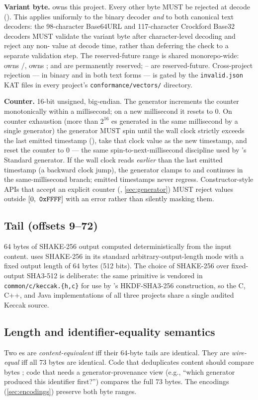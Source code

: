 \textbf{Variant byte.}  owns this project. Every other byte MUST be rejected at decode (). This applies uniformly to the binary decoder \emph{and} to both canonical text decoders: the 98-character Base64URL and 117-character Crockford Base32 decoders MUST validate the variant byte after character-level decoding and reject any non- value at decode time, rather than deferring the check to a separate validation step. The reserved-future range is shared monorepo-wide: \tesseraid{} owns /, \tesseraseal{} owns ;  and  are permanently reserved; -- are reserved-future. Cross-project rejection --- in binary and in both text forms --- is gated by the \texttt{invalid.json} KAT files in every project's \texttt{conformance/vectors/} directory.

\textbf{Counter.} 16-bit unsigned, big-endian. The generator increments the counter monotonically within a millisecond; on a new millisecond it resets to 0. On counter exhaustion (more than $2^{16}$ \tesserahash{}es generated in the same millisecond by a single generator) the generator MUST spin until the wall clock strictly exceeds the last emitted timestamp (), take that clock value as the new timestamp, and reset the counter to 0 --- the same spin-to-next-millisecond discipline used by \tesseraid{}'s Standard generator. If the wall clock reads \emph{earlier} than the last emitted timestamp (a backward clock jump), the generator clamps to  and continues in the same-millisecond branch; emitted timestamps never regress. Constructor-style APIs that accept an explicit counter (, \cref{sec:generator}) MUST reject values outside $[0,\ \texttt{0xFFFF}]$ with an error rather than silently masking them.

\subsection{Tail (offsets 9--72)}

64 bytes of SHAKE-256 \citep{fips202} output computed deterministically from the input content. \tesserahash{} uses SHAKE-256 in its standard arbitrary-output-length mode with a fixed output length of 64 bytes (512 bits). The choice of SHAKE-256 over fixed-output SHA3-512 is deliberate: the same primitive is vendored in \texttt{common/c/keccak.\{h,c\}} for use by \tesseraseal{}'s HKDF-SHA3-256 construction, so the C, C++, and Java implementations of all three projects share a single audited Keccak source.

\subsection{Length and identifier-equality semantics}

Two \tesserahash{}es are \emph{content-equivalent} iff their 64-byte tails are identical. They are \emph{wire-equal} iff all 73 bytes are identical. Code that deduplicates content should compare bytes ; code that needs a generator-provenance view (e.g., ``which generator produced this identifier first?'') compares the full 73 bytes. The encodings (\cref{sec:encodings}) preserve both byte ranges.

